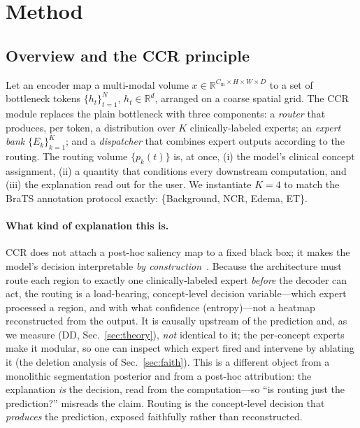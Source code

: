 \documentclass[runningheads]{llncs}
\newcommand{\Rb}{\mathbb{R}}
\begin{document}
\section{Method}\label{sec:method}
\subsection{Overview and the CCR principle}
Let an encoder map a multi-modal volume $x\in\Rb^{C_{\text{in}}\times H\times W\times D}$
to a set of bottleneck tokens $\{h_t\}_{t=1}^{N}$, $h_t\in\Rb^{d}$, arranged on a coarse
spatial grid. The CCR module replaces the plain bottleneck with three components: a
\emph{router} that produces, per token, a distribution over $K$ clinically-labeled
experts; an \emph{expert bank} $\{E_k\}_{k=1}^K$; and a \emph{dispatcher} that combines
expert outputs according to the routing. The routing volume $\{p_k(t)\}$ is, at once, (i)
the model's clinical concept assignment, (ii) a quantity that conditions every downstream
computation, and (iii) the explanation read out for the user. We instantiate $K{=}4$ to
match the BraTS annotation protocol exactly: \{Background, NCR, Edema, ET\}.

\paragraph{What kind of explanation this is.}
CCR does not attach a post-hoc saliency map to a fixed black box; it makes the model's
decision interpretable \emph{by construction}~\cite{rudin2019stop}. Because the architecture
must route each region to exactly one clinically-labeled expert \emph{before} the decoder can
act, the routing is a load-bearing, concept-level decision variable---which expert processed a
region, and with what confidence (entropy)---not a heatmap reconstructed from the output. It is
causally upstream of the prediction and, as we measure (DD, Sec.~\ref{sec:theory}), \emph{not}
identical to it; the per-concept experts make it modular, so one can inspect which expert fired
and intervene by ablating it (the deletion analysis of Sec.~\ref{sec:faith}). This is a
different object from a monolithic segmentation posterior and from a post-hoc attribution: the
explanation \emph{is} the decision, read from the computation---so ``is routing just the
prediction?'' misreads the claim. Routing is the concept-level decision that \emph{produces}
the prediction, exposed faithfully rather than reconstructed.
\end{document}

